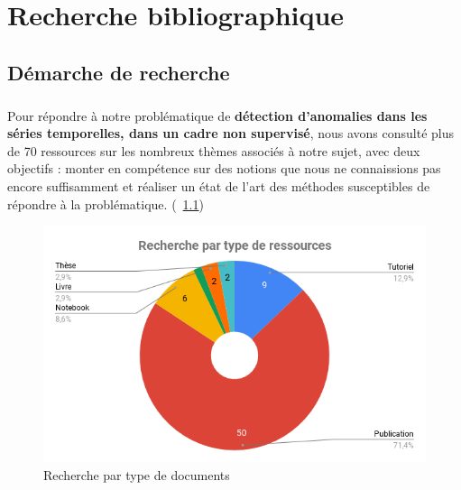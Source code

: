 \chapter{Recherche bibliographique}

\section{Démarche de recherche}

\paragraph{}

Pour répondre à notre problématique de {\bf{détection d'anomalies dans les séries temporelles, dans un cadre non supervisé}}, nous avons consulté plus de 70 ressources sur les nombreux thèmes associés à notre sujet, avec deux objectifs : monter en compétence sur des notions que nous ne connaissions pas encore suffisamment et réaliser un état de l'art des méthodes susceptibles de répondre à la problématique. (~\ref{fig: bibnat})


\begin{figure}[!ht]
\begin{center}
\includegraphics[scale=0.5]{rapport/images/Ch3_RechercheParTypeRessources.png}
\end{center}
\caption{Recherche par type de documents}
\label{fig: bibnat}
\end{figure}
\FloatBarrier



